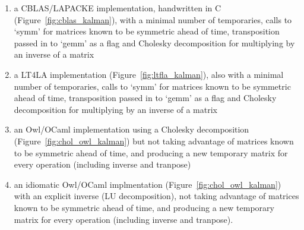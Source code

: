 \begin{enumerate}

    \item a CBLAS/LAPACKE implementation, handwritten in C
        (Figure~\ref{fig:cblas_kalman}), with a minimal number of temporaries,
        calls to `symm' for matrices known to be symmetric ahead of time,
        transposition passed in to `gemm' as a flag and Cholesky decomposition
        for multiplying by an inverse of a matrix

    \item a LT4LA implementation (Figure~\ref{fig:ltfla_kalman}), also with a
        minimal number of temporaries, calls to `symm' for matrices known to be
        symmetric ahead of time, transposition passed in to `gemm' as a flag
        and Cholesky decomposition for multiplying by an inverse of a matrix

    \item an Owl/OCaml implementation using a Cholesky decomposition
        (Figure~\ref{fig:chol_owl_kalman}) but not taking advantage of matrices
        known to be symmetric ahead of time, and producing a new temporary
        matrix for every operation (including inverse and tranpose)

    \item an idiomatic Owl/OCaml implmentation
        (Figure~\ref{fig:chol_owl_kalman}) with an explicit inverse (LU
        decomposition), not taking advantage of matrices known to be symmetric
        ahead of time, and producing a new temporary matrix for every operation
        (including inverse and tranpose).

\end{enumerate}

